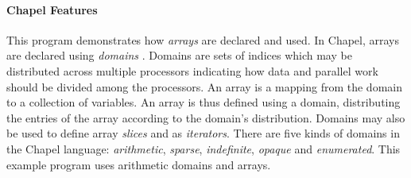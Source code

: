\paragraph{Chapel Features}
This program demonstrates how {\em arrays}  
are declared and used.  In Chapel, 
arrays are declared using {\em domains} .  
Domains are sets of indices which may be distributed
across multiple processors indicating how data and parallel work should
be divided among the processors.  An array is a mapping from the domain
to a collection of variables.  An array is thus defined using a domain, distributing
the entries of the array according to the domain's distribution.
Domains may also be used to define array {\em slices} and as {\em iterators}.
There are five kinds of domains in
the Chapel language:
  {\em arithmetic}, {\em sparse}, {\em indefinite},
{\em opaque} and {\em enumerated}.  This example program uses arithmetic domains
and arrays.  

